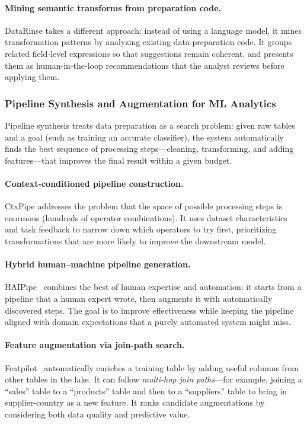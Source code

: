 \documentclass[sigconf]{acmart}
\begin{document}
\paragraph{Mining semantic transforms from preparation code.}
DataRinse takes a different approach: instead of using a language model, it mines transformation patterns by analyzing existing data-preparation code. It groups related field-level expressions so that suggestions remain coherent, and presents them as human-in-the-loop recommendations that the analyst reviews before applying them.



\subsubsection{Pipeline Synthesis and Augmentation for ML Analytics}
Pipeline synthesis treats data preparation as a search problem: given raw tables and a goal (such as training an accurate classifier), the system automatically finds the best sequence of processing steps---cleaning, transforming, and adding features---that improves the final result within a given budget.

\paragraph{Context-conditioned pipeline construction.}
CtxPipe addresses the problem that the space of possible processing steps is enormous (hundreds of operator combinations). It uses dataset characteristics and task feedback to narrow down which operators to try first, prioritizing transformations that are more likely to improve the downstream model.

\paragraph{Hybrid human--machine pipeline generation.}
HAIPipe~\cite{10.1145/3588945} combines the best of human expertise and automation: it starts from a pipeline that a human expert wrote, then augments it with automatically discovered steps. The goal is to improve effectiveness while keeping the pipeline aligned with domain expectations that a purely automated system might miss.

\paragraph{Feature augmentation via join-path search.}
Featpilot~\cite{11113027} automatically enriches a training table by adding useful columns from other tables in the lake. It can follow \emph{multi-hop join paths}---for example, joining a ``sales'' table to a ``products'' table and then to a ``suppliers'' table to bring in supplier-country as a new feature. It ranks candidate augmentations by considering both data quality and predictive value.
\end{document}
